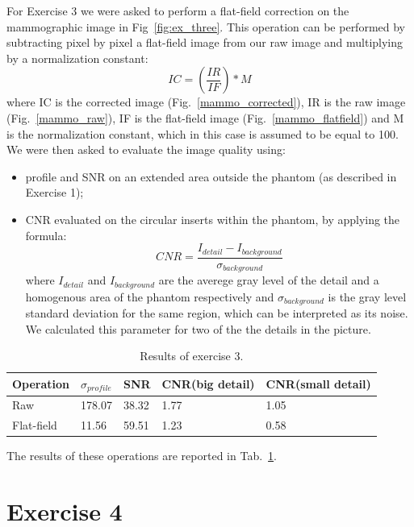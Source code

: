 \documentclass[a4paper]{article}
\begin{document}
For Exercise 3 we were asked to perform a flat-field correction on the mammographic image in Fig~\ref{fig:ex_three}. This operation can be performed by subtracting pixel by pixel a flat-field image from our raw image and multiplying by a normalization constant:
\begin{equation}
IC=(\frac{IR}{IF})* M
\end{equation}
where IC is the corrected image (Fig.~\ref{mammo_corrected}), IR is the raw image (Fig.~\ref{mammo_raw}), IF is the flat-field image (Fig.~\ref{mammo_flatfield}) and M is the normalization constant, which in this case is assumed to be equal to 100.
We were then asked to evaluate the image quality using:
\begin{itemize}
	\item profile and SNR on an extended area outside the phantom (as described in Exercise 1);
	\item CNR evaluated on the circular inserts within the phantom, by applying the formula:
	\begin{equation}
	CNR=\frac{I_{detail}-I_{background}}{\sigma_{background}}
	\end{equation}
	where $I_{detail}$ and $I_{background}$ are the averege gray level of the detail and a homogenous area of the phantom respectively and $\sigma_{background}$ is the gray level standard deviation for the same region, which can be interpreted as its noise. We calculated this parameter for two of the the details in the picture.
\end{itemize}

\begin{table}[h]
	\centering
	\begin{tabular}{| l | l | l | l | l |}
		\hline
		 Operation  & $\sigma_{profile}$ & SNR   & CNR(big detail) & CNR(small detail)\\ \hline
     Raw        & 178.07             & 38.32 & 1.77            & 1.05 \\ \hline
     Flat-field & 11.56              & 59.51 & 1.23            & 0.58 \\ \hline
	\end{tabular}
  \caption{Results of exercise 3.}
  \label{tab:ex_3}
\end{table}

The results of these operations are reported in Tab.~\ref{tab:ex_3}.

\clearpage

\section*{Exercise 4}
\end{document}
